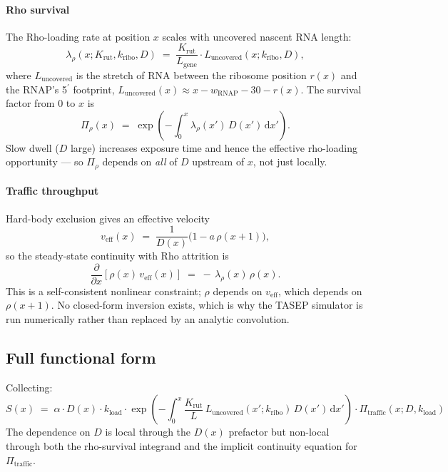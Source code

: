 \documentclass[11pt]{article}
\newcommand{\Krut}{K_{\text{rut}}}
\newcommand{\kload}{k_{\text{load}}}
\newcommand{\kribo}{k_{\text{ribo}}}
\begin{document}
\paragraph{Rho survival} The Rho-loading rate at position $x$ scales
with uncovered nascent RNA length:
\begin{equation}
  \lambda_{\rho}(x;\Krut,\kribo,D) \;=\; \frac{\Krut}{L_{\text{gene}}}
    \cdot L_{\text{uncovered}}(x;\kribo,D),
\end{equation}
where $L_{\text{uncovered}}$ is the stretch of RNA between the ribosome
position $r(x)$ and the RNAP's 5$^\prime$ footprint,
\(
L_{\text{uncovered}}(x) \approx x - w_{\text{RNAP}} - 30 - r(x).
\)
The survival factor from $0$ to $x$ is
\begin{equation}
  \Pi_{\rho}(x) \;=\; \exp\!\left(-\int_{0}^{x}
    \lambda_{\rho}(x')\,D(x')\,\mathrm{d}x'\right).
\end{equation}
Slow dwell ($D$ large) increases exposure time and hence the effective
rho-loading opportunity --- so $\Pi_{\rho}$ depends on \emph{all} of
$D$ upstream of $x$, not just locally.

\paragraph{Traffic throughput} Hard-body exclusion gives an effective
velocity
\begin{equation}
  v_{\text{eff}}(x) \;=\; \frac{1}{D(x)}\bigl(1 - a\,\rho(x+1)\bigr),
\end{equation}
so the steady-state continuity with Rho attrition is
\begin{equation}
  \frac{\partial}{\partial x}\!\left[\rho(x)\,v_{\text{eff}}(x)\right]
  \;=\; -\,\lambda_{\rho}(x)\,\rho(x).
\end{equation}
This is a self-consistent nonlinear constraint; $\rho$ depends on
$v_{\text{eff}}$, which depends on $\rho(x+1)$. No closed-form inversion
exists, which is why the TASEP simulator is run numerically rather than
replaced by an analytic convolution.

\subsection{Full functional form}

Collecting:
\begin{equation}
\boxed{
  S(x) \;=\; \alpha \cdot D(x) \cdot \kload
      \cdot \exp\!\left(-\int_{0}^{x}\frac{\Krut}{L}\,
          L_{\text{uncovered}}(x';\kribo)\,D(x')\,\mathrm{d}x'\right)
      \cdot \Pi_{\text{traffic}}(x;D,\kload)
}
\end{equation}
The dependence on $D$ is local through the $D(x)$ prefactor but
non-local through both the rho-survival integrand and the implicit
continuity equation for $\Pi_{\text{traffic}}$.
\end{document}
